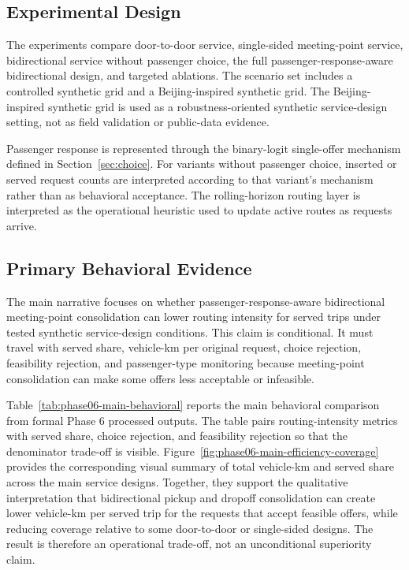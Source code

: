 \subsection{Experimental Design}

The experiments compare door-to-door service, single-sided meeting-point service,
bidirectional service without passenger choice, the full passenger-response-aware
bidirectional design, and targeted ablations. The scenario set includes a controlled
synthetic grid and a Beijing-inspired synthetic grid. The Beijing-inspired synthetic
grid is used as a robustness-oriented synthetic service-design setting, not as field
validation or public-data evidence.

Passenger response is represented through the binary-logit single-offer mechanism
defined in Section~\ref{sec:choice}. For variants without passenger choice, inserted or
served request counts are interpreted according to that variant's mechanism rather than
as behavioral acceptance. The rolling-horizon routing layer is interpreted as the
operational heuristic used to update active routes as requests arrive.

\subsection{Primary Behavioral Evidence}

The main narrative focuses on whether passenger-response-aware bidirectional
meeting-point consolidation can lower routing intensity for served trips under tested
synthetic service-design conditions. This claim is conditional. It must travel with
served share, vehicle-km per original request, choice rejection, feasibility rejection,
and passenger-type monitoring because meeting-point consolidation can make some offers
less acceptable or infeasible.

Table~\ref{tab:phase06-main-behavioral} reports the main behavioral comparison from
formal Phase 6 processed outputs. The table pairs routing-intensity metrics with served
share, choice rejection, and feasibility rejection so that the denominator trade-off is
visible. Figure~\ref{fig:phase06-main-efficiency-coverage} provides the corresponding
visual summary of total vehicle-km and served share across the main service designs.
Together, they support the qualitative interpretation that bidirectional pickup and
dropoff consolidation can create lower vehicle-km per served trip for the requests that
accept feasible offers, while reducing coverage relative to some door-to-door or
single-sided designs. The result is therefore an operational trade-off, not an
unconditional superiority claim.

